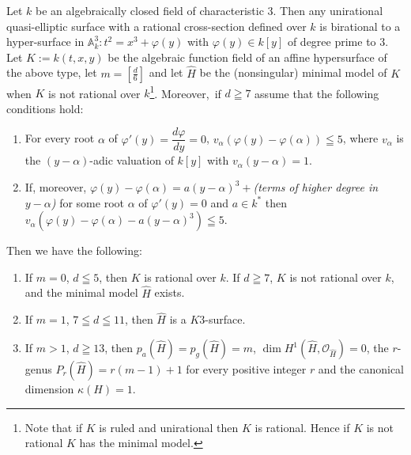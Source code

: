 \subsubsection{}\label{chap3:2.1.1}
\begin{theorem*}
  Let $k$ be an algebraically closed field of characteristic $3$. Then
  any unirational quasi-elliptic surface with a rational cross-section
  defined over $k$ is birational to a hyper-surface in
  $\mathbb{A}^{3}_{k}:t^{2}=x^{3}+\varphi(y)$ with $\varphi(y)\in k[y]$
  of degree prime to $3$. Let $K:=k(t,x,y)$ be the algebraic function
  field of an affine hypersurface of the above type, let
  $m=[\frac{d}{6}]$ and let $\widehat{H}$ be the (nonsingular) minimal
  model of $K$ when $K$ is not rational over $k$\footnote{Note that if
    $K$ is ruled and unirational then $K$ is rational. Hence if $K$ is
    not rational $K$ has the minimal model.}. Moreover,\pageoriginale\ if
  $d\geqq 7$ assume that the following conditions hold:
  \begin{enumerate}
    \renewcommand{\labelenumi}{\rm(\theenumi)}
  \item For every root $\alpha$ of $\varphi'(y)=\dfrac{d\varphi}{dy}=0$,
    $v_{\alpha}(\varphi(y)-\varphi(\alpha))\leqq 5$, where $v_{\alpha}$
    is the $(y-\alpha)$-adic valuation of $k[y]$ with
    $v_{\alpha}(y-\alpha)=1$.
    
  \item If, moreover,
    $\varphi(y)-\varphi(\alpha)=a(y-\alpha)^{3}+${\em (terms of higher
    degree in $y-\alpha$)} for some root $\alpha$ of $\varphi'(y)=0$ and
    $a\in k^{\ast}$ then
    $v_{\alpha}(\varphi(y)-\varphi(\alpha)-a(y-\alpha)^{3})\leqq 5$.
  \end{enumerate}
  Then we have the following:
  \begin{enumerate}
    \renewcommand{\theenumi}{\roman{enumi}}
    \renewcommand{\labelenumi}{\rm(\theenumi)}
  \item If $m=0$, \iec $d\leqq 5$, then $K$ is rational over $k$. If
    $d\geqq 7$, $K$ is not rational over $k$, and the minimal model
    $\widehat{H}$ exists.
    
  \item If $m=1$, \iec $7\leqq d\leqq 11$, then $\widehat{H}$ is a
    $K3$-surface.
    
  \item If $m>1$, \iec $d\geqq 13$, then
    $p_{a}(\widehat{H})=p_{g}(\widehat{H})=m$, $\dim
    H^{1}(\widehat{H},\mathscr{O}_{\widehat{H}})=0$, the $r$-genus
    $P_{r}(\widehat{H})=r(m-1)+1$ for every positive integer $r$ and the
    canonical dimension $\kappa(H)=1$.
  \end{enumerate}
\end{theorem*}

